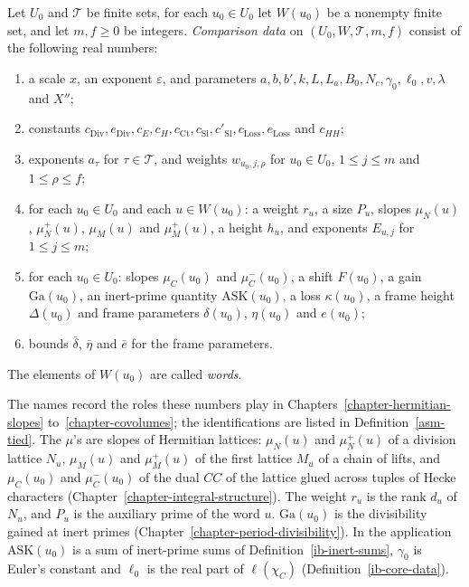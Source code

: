 \begin{definition}\label{ib-comparison-data}
Let $U_0$ and $\mathcal T$ be finite sets, for each $u_0\in U_0$ let $W(u_0)$ be
a nonempty finite set, and let $m,f\geq0$ be integers. \emph{Comparison data} on
$(U_0,W,\mathcal T,m,f)$ consist of the following real numbers:
\begin{enumerate}
\item a scale $x$, an exponent $\varepsilon$, and parameters
  $a,b,b',k,L,L_a,B_0,N_c,\gamma_0,\ell_0,v,\lambda$ and $X''$;
\item constants $c_{\mathrm{Div}},e_{\mathrm{Div}},c_E,c_H,c_{\mathrm{Ct}},
  c_{\mathrm{Sl}},c'_{\mathrm{Sl}},c_{\mathrm{Loss}},e_{\mathrm{Loss}}$ and
  $c_{HH}$;
\item exponents $a_\tau$ for $\tau\in\mathcal T$, and weights
  $w_{u_0,j,\rho}$ for $u_0\in U_0$, $1\leq j\leq m$ and $1\leq\rho\leq f$;
\item for each $u_0\in U_0$ and each $u\in W(u_0)$: a weight $r_u$, a size
  $P_u$, slopes $\mu_N(u)$, $\mu_N^+(u)$, $\mu_M(u)$ and $\mu_M^+(u)$, a height
  $h_u$, and exponents $E_{u,j}$ for $1\leq j\leq m$;
\item for each $u_0\in U_0$: slopes $\mu_C(u_0)$ and $\mu_C^-(u_0)$, a shift
  $F(u_0)$, a gain $\mathrm{Ga}(u_0)$, an inert-prime quantity
  $\mathrm{ASK}(u_0)$, a loss $\kappa(u_0)$, a frame height $\Delta(u_0)$ and
  frame parameters $\delta(u_0)$, $\eta(u_0)$ and $e(u_0)$;
\item bounds $\bar\delta$, $\bar\eta$ and $\bar e$ for the frame parameters.
\end{enumerate}
The elements of $W(u_0)$ are called \emph{words}.
\end{definition}

The names record the roles these numbers play in
Chapters~\ref{chapter-hermitian-slopes} to~\ref{chapter-covolumes}; the
identifications are listed in Definition~\ref{asm-tied}. The $\mu$'s are slopes
of Hermitian lattices: $\mu_N(u)$ and $\mu_N^+(u)$ of a division lattice $N_u$,
$\mu_M(u)$ and $\mu_M^+(u)$ of the first lattice $M_u$ of a chain of lifts, and
$\mu_C(u_0)$ and $\mu_C^-(u_0)$ of the dual $CC$ of the lattice glued across
tuples of Hecke characters (Chapter~\ref{chapter-integral-structure}). The
weight $r_u$ is the rank $d_u$ of $N_u$, and $P_u$ is the auxiliary prime of
the word $u$. $\mathrm{Ga}(u_0)$ is the divisibility gained at inert primes
(Chapter~\ref{chapter-period-divisibility}). In the application
$\mathrm{ASK}(u_0)$ is a sum of inert-prime sums of
Definition~\ref{ib-inert-sums}, $\gamma_0$ is Euler's constant and $\ell_0$ is
the real part of $\ell(\chi_C)$ (Definition~\ref{ib-core-data}).

